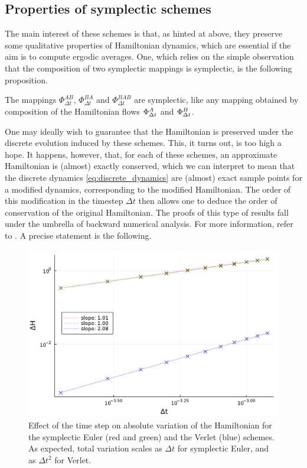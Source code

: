     \subsection{Properties of symplectic schemes}
    The main interest of these schemes is that, as hinted at above, they preserve some qualitative properties of Hamiltonian dynamics, which are essential if the aim is to compute ergodic averages.
    One, which relies on the simple observation that the composition of two symplectic mappings is symplectic, is the following proposition.

    \begin{prop}
        \label{prop:symplecticity_of_schemes}
        The mappings $\Phi_{\Delta t}^{AB}$, $\Phi_{\Delta t}^{BA}$ and $\Phi_{\Delta t}^{BAB}$ are symplectic, like any mapping obtained by composition of the Hamiltonian flows $\Phi_{\Delta t}^A$ and $\Phi_{\Delta t}^B$.
    \end{prop}

    One may ideally wish to guarantee that the Hamiltonian is preserved under the discrete evolution induced by these schemes. This, it turns out, is too high a hope.
    It happens, however, that, for each of these schemes, an approximate Hamiltonian is (almost) exactly conserved, which we can interpret to mean that the discrete dynamics \eqref{eq:discrete_dynamics} are (almost) exact sample points for a modified dynamics, corresponding to the modified Hamiltonian.
    The order of this modification in the timestep $\Delta t$ then allows one to deduce the order of conservation of the original Hamiltonian. The proofs of this type of results fall under the umbrella of backward numerical analysis. For more information, refer to \cite{HLG03}.
    A precise statement is the following.

    \begin{figure}[htbp]
        \begin{center}
          \includegraphics[width=0.7\linewidth]{figures/chapter1/hamiltonian_conservation.pdf}
          \caption{ \label{fig:hamiltonian_conservation}
            Effect of the time step on absolute variation of the Hamiltonian for the symplectic Euler (red and green) and the Verlet (blue) schemes. As expected, total variation scales as $\Delta t$ for symplectic Euler, and as $\Delta t^2$ for Verlet.
          }
        \end{center}
      \end{figure}
        
